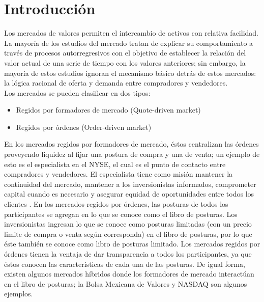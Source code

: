 \documentclass[11pt]{article}
\numberwithin{equation}{section} %
\begin{document}
\thispagestyle{empty}
\tableofcontents
\clearpage

\setcounter{page}{1}

\section{Introducción}

Los mercados de valores permiten el intercambio de activos con relativa facilidad. La mayoría de los estudios del mercado tratan de explicar su comportamiento a través de procesos autorregresivos con el objetivo de establecer la relación del valor actual de una serie de tiempo con los valores anteriores; sin embargo, la mayoría de estos estudios ignoran el mecanismo básico detrás de estos mercados: la lógica racional de oferta y demanda entre compradores y vendedores.\\

Los mercados se pueden clasificar en dos tipos:
\begin{itemize}
  \item Regidos por formadores de mercado (Quote-driven market)
  \item Regidos por órdenes (Order-driven market)
\end{itemize}

En los mercados regidos por formadores de mercado, éstos centralizan las órdenes proveyendo liquidez al fijar una postura de compra y una de venta; un ejemplo de esto es el especialista en el NYSE, el cual es el punto de contacto entre compradores y vendedores. El especialista tiene como misión mantener la continuidad del mercado, mantener a los inversionistas informados, comprometer capital cuando es necesario y asegurar equidad de oportunidades entre todos los clientes \cite{nyse}. En los mercados regidos por órdenes, las posturas de todos los participantes se agregan en lo que se conoce como el libro de posturas. Los inversionistas ingresan lo que se conoce como posturas limitadas (con un precio limite de compra o venta según corresponda) en el libro de posturas, por lo que éste también se conoce como libro de posturas limitado. Los mercados regidos por órdenes tienen la ventaja de dar transparencia a todos los participantes, ya que éstos conocen las características de cada una de las posturas. De igual forma, existen algunos mercados híbridos donde los formadores de mercado interactúan en el libro de posturas; la Bolsa Mexicana de Valores y NASDAQ son algunos ejemplos.\\
\end{document}
